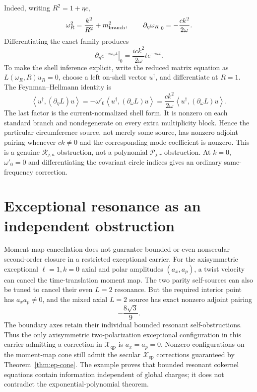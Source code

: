 \documentclass[11pt]{article}
\theoremstyle{definition}
\theoremstyle{remark}
\newcommand{\cP}{\mathcal P}
\newcommand{\cR}{\mathcal R}
\newcommand{\Xep}{\mathscr X_{\mathrm{ep}}}
\newcommand{\Xqp}{\mathscr X_{\mathrm{qp}}}
\begin{document}
Indeed, writing \(R^2=1+\eta c\),
\[
 \omega_R^2=\frac{k^2}{R^2}+m_{\rm branch}^2,
 \qquad
 \left.\partial_\eta\omega_R\right|_0=-\frac{ck^2}{2\omega}.
\]
Differentiating the exact family produces
\[
 \left.\partial_\eta e^{-i\omega_Rt}\right|_0
 =\frac{i ck^2}{2\omega}t e^{-i\omega t}.
\]
To make the shell inference explicit, write the reduced matrix equation as
\(L(\omega_R,R)u_R=0\), choose a left on-shell vector \(u^\dagger\), and
differentiate at \(R=1\).  The Feynman--Hellmann identity is
\begin{equation}\label{eq:circumference-FH}
 \left\langle u^\dagger,(\partial_\eta L)u\right\rangle
 =-\omega'_0
   \left\langle u^\dagger,(\partial_\omega L)u\right\rangle
 =\frac{ck^2}{2\omega}
   \left\langle u^\dagger,(\partial_\omega L)u\right\rangle .
\end{equation}
The last factor is the current-normalized shell form.  It is nonzero on each
standard branch and nondegenerate on every extra multiplicity block.  Hence
the particular circumference source, not merely some source, has nonzero
adjoint pairing whenever \(ck\ne0\) and the corresponding mode coefficient
is nonzero.  This is a genuine \(\cR_{j,a}\) obstruction, not a polynomial
\(\cP_{j,r}\) obstruction.  At \(k=0\), \(\omega'_0=0\) and differentiating
the covariant circle indices gives an ordinary same-frequency correction.

\section{Exceptional resonance as an independent obstruction}

Moment-map cancellation does not guarantee bounded or even nonsecular
second-order closure in a restricted exceptional carrier.  For the
axisymmetric exceptional \(\ell=1,k=0\) axial and polar amplitudes
\((a_x,a_p)\), a twist velocity can cancel the time-translation moment map.
The two parity self-sources can also be tuned to cancel their even
\(L=2\) resonance.  But the required interior point has
\(a_xa_p\ne0\), and the mixed axial \(L=2\) source has exact nonzero adjoint
pairing
\[
 -\frac{8\sqrt3}{9}.
\]
The boundary axes retain their individual bounded resonant
self-obstructions.  Thus the only axisymmetric two-polarization exceptional
configuration in this carrier admitting a correction in \(\Xqp\) is
\(a_x=a_p=0\).  Nonzero configurations on the moment-map cone still admit
the secular \(\Xep\) corrections guaranteed by Theorem~\ref{thm:ep-cone}.
The example proves that bounded resonant cokernel equations contain
information independent of global charges; it does not contradict the
exponential-polynomial theorem.
\end{document}
